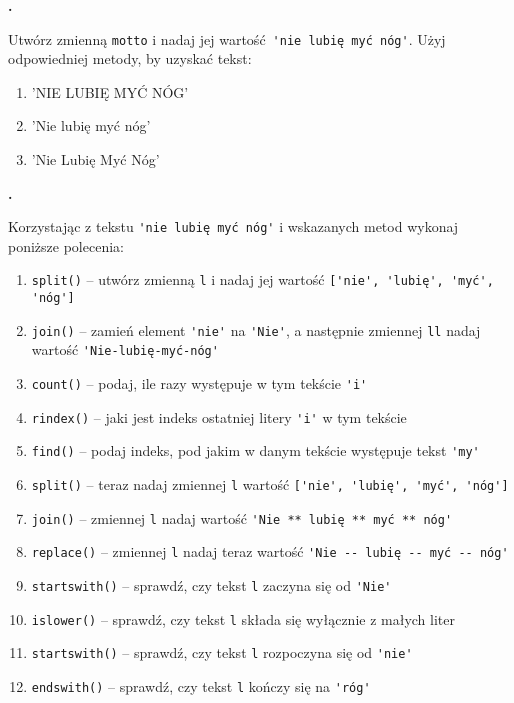 \documentclass[a4paper]{article}
\begin{document}
\textbf{.}\addtocounter{zadanie}{1} Utwórz zmienną \verb|motto| i nadaj jej wartość \verb|'nie lubię myć nóg'|. Użyj odpowiedniej metody, by uzyskać tekst:

\begin{enumerate}[label=\arabic*.]
    \item 'NIE LUBIĘ MYĆ NÓG'
    \item 'Nie lubię myć nóg'
    \item 'Nie Lubię Myć Nóg'
\end{enumerate}

\textbf{.}\addtocounter{zadanie}{1} Korzystając z tekstu \verb|'nie lubię myć nóg'| i wskazanych metod wykonaj poniższe polecenia:

\begin{enumerate}[label=\arabic*.]
    \item \verb|split()| -- utwórz zmienną \verb|l| i nadaj jej wartość \verb|['nie', 'lubię', 'myć', 'nóg']|
    \item \verb|join()| -- zamień element \verb|'nie'| na \verb|'Nie'|, a następnie zmiennej \verb|ll| nadaj wartość \verb|'Nie-lubię-myć-nóg'|
    \item \verb|count()| -- podaj, ile razy występuje w tym tekście \verb|'i'|
    \item \verb|rindex()| -- jaki jest indeks ostatniej litery \verb|'i'| w tym tekście
    \item \verb|find()| -- podaj indeks, pod jakim w danym tekście występuje tekst \verb|'my'|
    \item \verb|split()| -- teraz nadaj zmiennej \verb|l| wartość \verb|['nie', 'lubię', 'myć', 'nóg']|
    \item \verb|join()| -- zmiennej \verb|l| nadaj wartość \verb|'Nie ** lubię ** myć ** nóg'|
    \item \verb|replace()| -- zmiennej \verb|l| nadaj teraz wartość \verb|'Nie -- lubię -- myć -- nóg'|
    \item \verb|startswith()| -- sprawdź, czy tekst \verb|l| zaczyna się od \verb|'Nie'|
    \item \verb|islower()| -- sprawdź, czy tekst \verb|l| składa się wyłącznie z małych liter
    \item \verb|startswith()| -- sprawdź, czy tekst \verb|l| rozpoczyna się od \verb|'nie'|
    \item \verb|endswith()| -- sprawdź, czy tekst \verb|l| kończy się na \verb|'róg'|

\end{enumerate}
\end{document}
